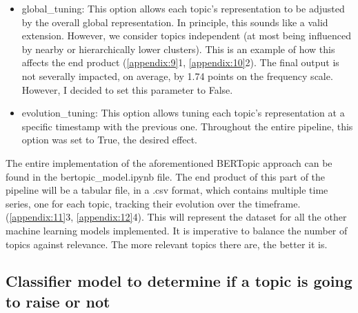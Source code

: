 \documentclass[12pt,MSc,a4paper,oneside]{muthesis}
\begin{document}
\begin{itemize}
    \item global\_tuning: This option allows each topic's representation to be adjusted by the overall global representation. In principle, this sounds like a valid extension. However, we consider topics independent (at most being influenced by nearby or hierarchically lower clusters). This is an example of how this affects the end product (\ref{appendix:9}1, \ref{appendix:10}2). The final output is not severally impacted, on average, by 1.74 points on the frequency scale. However, I decided to set this parameter to False.
    \item  evolution\_tuning: This option allows tuning each topic's representation at a specific timestamp with the previous one. Throughout the entire pipeline, this option was set to True, the desired effect.
\end{itemize}

The entire implementation of the aforementioned BERTopic approach can be found in the bertopic\_model.ipynb file. The end product of this part of the pipeline will be a tabular file, in a .csv format, which contains multiple time series, one for each topic, tracking their evolution over the timeframe. (\ref{appendix:11}3, \ref{appendix:12}4). This will represent the dataset for all the other machine learning models implemented. It is imperative to balance the number of topics against relevance. The more relevant topics there are, the better it is.

\subsection{Classifier model to determine if a topic is going to raise or not}
\end{document}
